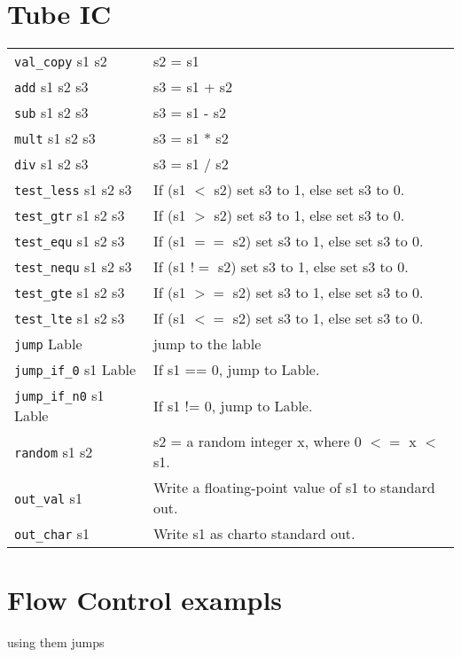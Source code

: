 \documentclass[10pt,landscape]{article}
\begin{document}
\begin{multicols}{3}
        \section{Tube IC}
        \begin{tabular}{p{} p{}}
        \verb!val_copy! s1 s2       & s2 = s1 \\
        \verb!add! s1 s2  s3        & s3 = s1 + s2\\
        \verb!sub! s1 s2  s3        & s3 = s1 - s2 \\
        \verb!mult! s1 s2  s3       & s3 = s1 * s2 \\
        \verb!div! s1 s2  s3        & s3 = s1 / s2 \\
        \verb!test_less! s1 s2  s3  & If (s1 $<$ s2) set s3 to 1, else set s3 to 0. \\
        \verb!test_gtr! s1 s2  s3   & If (s1 $>$ s2) set s3 to 1, else set s3 to 0. \\
        \verb!test_equ! s1 s2  s3   & If (s1 $==$ s2) set s3 to 1, else set s3 to 0. \\
        \verb!test_nequ! s1 s2  s3  & If (s1 $!=$ s2) set s3 to 1, else set s3 to 0. \\
        \verb!test_gte! s1 s2  s3   & If (s1 $>=$ s2) set s3 to 1, else set s3 to 0. \\
        \verb!test_lte! s1 s2  s3   & If (s1 $<=$ s2) set s3 to 1, else set s3 to 0. \\
        \verb!jump! Lable       & jump to the lable \\
        \verb!jump_if_0! s1 Lable      & If s1 == 0, jump to Lable. \\
        \verb!jump_if_n0! s1 Lable       & If s1 != 0, jump to Lable. \\
        \verb!random! s1 s2       & s2 = a random integer x, where 0 $<=$ x $<$ s1. \\
        \verb!out_val! s1       & Write a floating-point value of s1 to standard out. \\
        \verb!out_char! s1      & Write s1 as charto standard out. \\

        \end{tabular}
		\section{Flow Control exampls}
        using them jumps
		
	\end{multicols}
\end{document}
